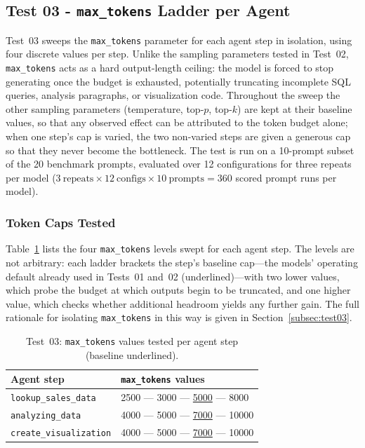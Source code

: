 \subsection{Test 03 - \texttt{max\_tokens} Ladder per Agent}
\label{subsec:res03}

Test~03 sweeps the \texttt{max\_tokens} parameter for each agent step
in isolation, using four discrete values per step. Unlike the sampling
parameters tested in Test~02, \texttt{max\_tokens} acts as a hard
output-length ceiling: the model is forced to stop generating once the
budget is exhausted, potentially truncating incomplete SQL queries,
analysis paragraphs, or visualization code. Throughout the sweep the other
sampling parameters (temperature, top-$p$, top-$k$) are kept at their baseline
values, so that any observed effect can be attributed to the token budget
alone; when one step's cap is varied, the two non-varied steps are given a
generous cap so that they never become the bottleneck. The test is run on a
10-prompt subset of the 20 benchmark prompts, evaluated over 12 configurations
for three repeats per model ($3~\text{repeats} \times 12~\text{configs} \times
10~\text{prompts} = 360$ scored prompt runs per model).

\subsubsection{Token Caps Tested}

Table~\ref{tab:test03caps} lists the four \texttt{max\_tokens} levels swept for
each agent step. The levels are not arbitrary: each ladder brackets the step's
baseline cap---the models' operating default already used in Tests~01 and~02
(underlined)---with two lower values, which probe the budget at which outputs
begin to be truncated, and one higher value, which checks whether additional
headroom yields any further gain. The full rationale for isolating
\texttt{max\_tokens} in this way is given in Section~\ref{subsec:test03}.

\begin{table}[H]
\centering
{}
\begin{tabular}{|l|l|}
\hline
\rowcolor{bluePoli!30}
\textbf{Agent step} & \textbf{\texttt{max\_tokens} values} \T\B \\
\hline
\texttt{lookup\_sales\_data}    & 2500 — 3000 — \underline{5000} — 8000 \T\B \\
\hline
\texttt{analyzing\_data}        & 4000 — 5000 — \underline{7000} — 10000 \T\B \\
\hline
\texttt{create\_visualization}  & 4000 — 5000 — \underline{7000} — 10000 \T\B \\
\hline
\end{tabular}
\caption{Test~03: \texttt{max\_tokens} values tested per agent step (baseline underlined).}
\label{tab:test03caps}
\end{table}

